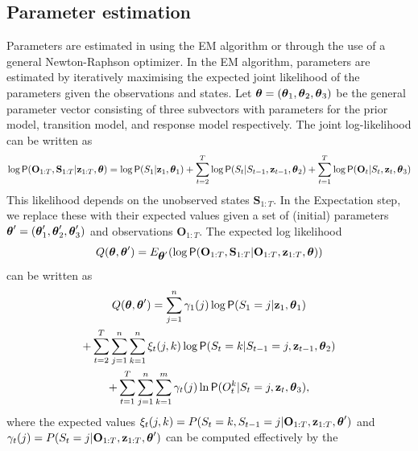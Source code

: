 \documentclass[article]{jss}
\newcommand{\vc}{\mathbf}
\newcommand{\greekv}[1]{\mbox{\boldmath$\mathrm{#1}$}}
\begin{document}
\subsection{Parameter estimation}

Parameters are estimated in  using the EM algorithm or
through the use of a general Newton-Raphson optimizer.  In the EM
algorithm, parameters are estimated by iteratively maximising the
expected joint likelihood of the parameters given the observations and
states.  Let $\greekv{\theta} = (\greekv{\theta}_1,
\greekv{\theta}_2,\greekv{\theta}_3)$ be the general parameter vector
consisting of three subvectors with parameters for the prior model,
transition model, and response model respectively.  The joint
log-likelihood can be written as
\begin{equation}
\log \Prob(\vc{O}_{1:T}, \vc{S}_{1:T}|\vc{z}_{1:T},\greekv{\theta}) = \log 
\Prob(S_1|\vc{z}_{1},\greekv{\theta}_1) 
+ \sum_{t=2}^{T} \log \Prob(S_t|S_{t-1},\vc{z}_{t-1},\greekv{\theta}_2) 
+ \sum_{t=1}^{T} \log \Prob(\vc{O}_t|S_t,\vc{z}_t,\greekv{\theta}_3)
\end{equation}
This likelihood depends on the unobserved states $\vc{S}_{1:T}$. In the 
Expectation step, we replace these with their expected values given a set of 
(initial) parameters $\greekv{\theta}' = (\greekv{\theta}'_1, 
\greekv{\theta}'_2,\greekv{\theta}'_3)$ and observations $\vc{O}_{1:T}$. The expected 
log likelihood 
\begin{equation}
Q(\greekv{\theta},\greekv{\theta}') = E_{\greekv{\theta}'} 
(\log \Prob(\vc{O}_{1:T},\vc{S}_{1:T}|\vc{O}_{1:T},\vc{z}_{1:T},\greekv{\theta}))
\end{equation}
can be written as
\begin{multline}
\label{eq:Q}
Q(\greekv{\theta},\greekv{\theta}') = 
\sum_{j=1}^n \gamma_1(j) \log \Prob(S_1=j|\vc{z}_1,\greekv{\theta}_1) \\ 
+ \sum_{t=2}^T \sum_{j=1}^n \sum_{k=1}^n \xi_t(j,k) \log \Prob(S_t = k|S_{t-1} 
= j,\vc{z}_{t-1},\greekv{\theta}_2)  \\
 + \sum_{t=1}^T \sum_{j=1}^n \sum_{k=1}^m \gamma_t(j) 
\ln \Prob(O^k_t|S_t=j,\vc{z}_t,\greekv{\theta}_3),
\end{multline}
where the expected values $\xi_t(j,k) =  P(S_t = k, S_{t-1} = j|\vc{O}_{1:T},
\vc{z}_{1:T},\greekv{\theta}')$ and $\gamma_t(j) = P(S_t = j|\vc{O}_{1:T},
\vc{z}_{1:T},\greekv{\theta}')$ can be computed effectively by the 
\end{document}
